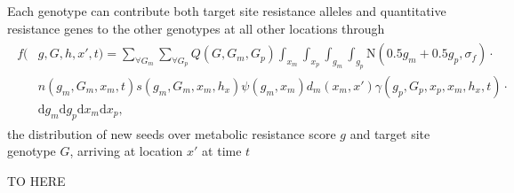 \documentclass[10pt,letterpaper]{article}
\begin{document}
Each genotype can contribute both target site resistance alleles and quantitative resistance genes to the other genotypes at all other locations through       
\begin{align}
\label{eq:fecund}
\begin{split}
	f(&g, G, h, x', t) = \displaystyle \sum_{\forall G_m}\sum_{\forall G_p} Q(G, G_m, G_p) \int_{x_m}\int_{x_p}\int_{g_m}\int_{g_p} \text{N}(0.5 g_m + 0.5 g_p, \sigma_f)\cdot\\
	&n(g_m, G_m, x_m, t)s(g_m, G_m, x_m, h_x) \psi(g_m, x_m) d_m(x_m, x') \gamma(g_p, G_p, x_p, x_m, h_x, t)\cdot\\
	&\text{d}g_m \text{d}g_p \text{d}x_m \text{d}x_p,
\end{split}
\end{align} 
the distribution of new seeds over metabolic resistance score $g$ and target site genotype $G$, arriving at location $x'$ at time $t$ 

TO HERE
          
\end{document}
